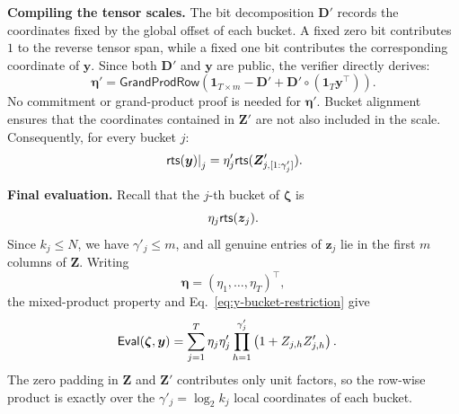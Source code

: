 \mysmallskip\noindent
\textbf{Compiling the tensor scales.}
The bit decomposition $\bm D'$ records the coordinates fixed by the global
offset of each bucket.  A fixed zero bit contributes $1$ to the reverse
tensor span, while a fixed one bit contributes the corresponding coordinate
of $\bm y$.  Since both $\bm D'$ and $\bm y$ are public, the verifier directly
derives:
\begin{equation}
\label{eq:eta-prime-public}
    \bm\eta'
    =
    \mathsf{GrandProdRow}\!\left(
        \bm1_{T\times m}
        -
        \bm D'
        +
        \bm D'
        \circ
        (\bm1_T\bm y^\top)
    \right).
\end{equation}
No commitment or grand-product proof is needed for $\bm\eta'$.  Bucket
alignment ensures that the coordinates contained in $\bm Z'$ are not also
included in the scale.  Consequently, for every bucket $j$:
\begin{equation}
\label{eq:y-bucket-restriction}
    \left.
        {\sf rts}(\bm y)
    \right|_j
    =
    \eta'_j
    {\sf rts}(
        \bm Z'_{j,[1:\gamma'_j]}
    ).
\end{equation}

\mysmallskip\noindent
\textbf{Final evaluation.}
Recall that the $j$-th bucket of $\bm\zeta$ is
\[
    \eta_j{\sf rts}(\bm z_j).
\]
Since $k_j\le N$, we have $\gamma'_j\le m$, and all genuine entries of
$\bm z_j$ lie in the first $m$ columns of $\bm Z$.  Writing
\[
\bm\eta=(\eta_1,\ldots,\eta_T)^\top,
\]
the mixed-product property and
Eq.~\eqref{eq:y-bucket-restriction} give
\begin{equation}
\label{eq:final-tbv-evaluation}
\begin{aligned}
\mathsf{Eval}(\bm\zeta, \bm y)
&=
\sum_{j=1}^{T}
\eta_j\eta'_j
\prod_{h=1}^{\gamma'_j}
\left(
    1+Z_{j,h}Z'_{j,h}
\right).
\end{aligned}
\end{equation}
The zero padding in $\bm Z$ and $\bm Z'$ contributes only unit factors, so
the row-wise product is exactly over the
$\gamma'_j=\log_2k_j$ local coordinates of each bucket.

